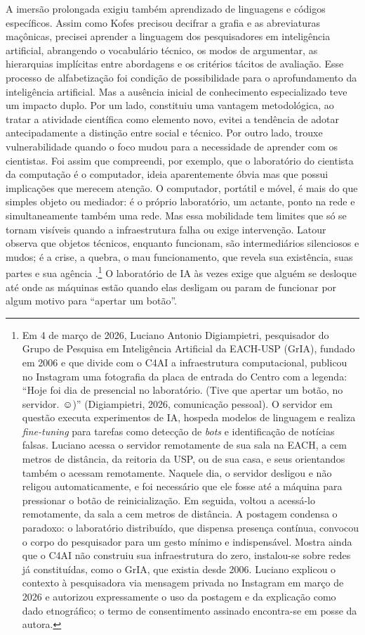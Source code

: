 A imersão prolongada exigiu também aprendizado de linguagens e códigos específicos. Assim como Kofes precisou decifrar a grafia e as abreviaturas maçônicas, precisei aprender a linguagem dos pesquisadores em inteligência artificial, abrangendo o vocabulário técnico, os modos de argumentar, as hierarquias implícitas entre abordagens e os critérios tácitos de avaliação. Esse processo de alfabetização foi condição de possibilidade para o aprofundamento da inteligência artificial. Mas a ausência inicial de conhecimento especializado teve um impacto duplo. Por um lado, constituiu uma vantagem metodológica, ao tratar a atividade científica como elemento novo, evitei a tendência de adotar antecipadamente a distinção entre social e técnico. Por outro lado, trouxe vulnerabilidade quando o foco mudou para a necessidade de aprender com os cientistas. Foi assim que compreendi, por exemplo, que o laboratório do cientista da computação é o computador, ideia aparentemente óbvia mas que possui implicações que merecem atenção. O computador, portátil e móvel, é mais do que simples objeto ou mediador: é o próprio laboratório, um actante, ponto na rede e simultaneamente também uma rede. Mas essa mobilidade tem limites que só se tornam visíveis quando a infraestrutura falha ou exige intervenção. Latour observa que objetos técnicos, enquanto funcionam, são intermediários silenciosos e mudos; é a crise, a quebra, o mau funcionamento, que revela sua existência, suas partes e sua agência \parencite[cap.~6]{Latour2017Esperanca}.\footnote{Em 4 de março de 2026, Luciano Antonio Digiampietri, pesquisador do Grupo de Pesquisa em Inteligência Artificial da EACH-USP (GrIA), fundado em 2006 e que divide com o C4AI a infraestrutura computacional, publicou no Instagram uma fotografia da placa de entrada do Centro com a legenda: \enquote{Hoje foi dia de presencial no laboratório. (Tive que apertar um botão, no servidor. ☺)} (Digiampietri, 2026, comunicação pessoal). O servidor em questão executa experimentos de IA, hospeda modelos de linguagem e realiza \textit{fine-tuning} para tarefas como detecção de \textit{bots} e identificação de notícias falsas. Luciano acessa o servidor remotamente de sua sala na EACH, a cem metros de distância, da reitoria da USP, ou de sua casa, e seus orientandos também o acessam remotamente. Naquele dia, o servidor desligou e não religou automaticamente, e foi necessário que ele fosse até a máquina para pressionar o botão de reinicialização. Em seguida, voltou a acessá-lo remotamente, da sala a cem metros de distância. A postagem condensa o paradoxo: o laboratório distribuído, que dispensa presença contínua, convocou o corpo do pesquisador para um gesto mínimo e indispensável. Mostra ainda que o C4AI não construiu sua infraestrutura do zero, instalou-se sobre redes já constituídas, como o GrIA, que existia desde 2006. Luciano explicou o contexto à pesquisadora via mensagem privada no Instagram em março de 2026 e autorizou expressamente o uso da postagem e da explicação como dado etnográfico; o termo de consentimento assinado encontra-se em posse da autora.} O laboratório de IA às vezes exige que alguém se desloque até onde as máquinas estão quando elas desligam ou param de funcionar por algum motivo para \enquote{apertar um botão}.

